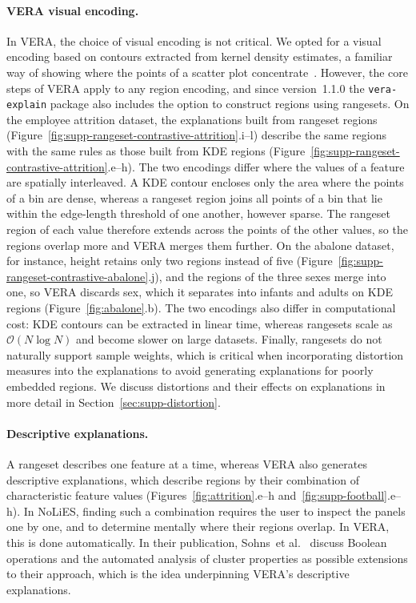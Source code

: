 \documentclass[10pt]{article}
\newcommand{\etal}{et al.}
\begin{document}
\paragraph{VERA visual encoding.}
In VERA, the choice of visual encoding is not critical.
We opted for a visual encoding based on contours extracted from kernel density estimates, a familiar way of showing where the points of a scatter plot concentrate~\cite{MayorgaGleicher2013,Sarikaya2018,Li2022}.
However, the core steps of VERA apply to any region encoding, and since version~1.1.0 the \texttt{vera-explain} package also includes the option to construct regions using rangesets.
On the employee attrition dataset, the explanations built from rangeset regions (Figure~\ref{fig:supp-rangeset-contrastive-attrition}.i--l) describe the same regions with the same rules as those built from KDE regions (Figure~\ref{fig:supp-rangeset-contrastive-attrition}.e--h).
The two encodings differ where the values of a feature are spatially interleaved. A KDE contour encloses only the area where the points of a bin are dense, whereas a rangeset region joins all points of a bin that lie within the edge-length threshold of one another, however sparse. The rangeset region of each value therefore extends across the points of the other values, so the regions overlap more and VERA merges them further.
On the abalone dataset, for instance, height retains only two regions instead of five (Figure~\ref{fig:supp-rangeset-contrastive-abalone}.j), and the regions of the three sexes merge into one, so VERA discards sex, which it separates into infants and adults on KDE regions (Figure~\ref{fig:abalone}.b).
The two encodings also differ in computational cost: KDE contours can be extracted in linear time, whereas rangesets scale as $\mathcal{O}(N \log N)$ and become slower on large datasets.
Finally, rangesets do not naturally support sample weights, which is critical when incorporating distortion measures into the explanations to avoid generating explanations for poorly embedded regions. We discuss distortions and their effects on explanations in more detail in Section~\ref{sec:supp-distortion}.

\paragraph{Descriptive explanations.}
A rangeset describes one feature at a time, whereas VERA also generates descriptive explanations, which describe regions by their combination of characteristic feature values (Figures~\ref{fig:attrition}.e--h and~\ref{fig:supp-football}.e--h).
In NoLiES, finding such a combination requires the user to inspect the panels one by one, and to determine mentally where their regions overlap. In VERA, this is done automatically.
In their publication, Sohns~\etal~\cite{Sohns2022} discuss Boolean operations and the automated analysis of cluster properties as possible extensions to their approach, which is the idea underpinning VERA's descriptive explanations.
\end{document}
